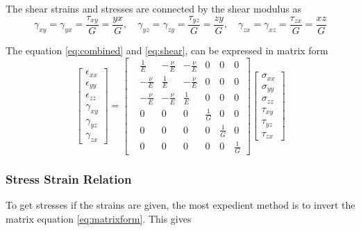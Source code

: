 The shear strains and stresses are connected by the shear modulus as
\begin{equation}
\gamma_{xy} = \gamma_{yx} = \frac{\tau_{xy}}{G} = \frac{yx}{G}, \quad 
\gamma_{yz} = \gamma_{zy} = \frac{\tau_{yz}}{G} = \frac{zy}{G}, \quad
\gamma_{zx} = \gamma_{xz} = \frac{\tau_{zx}}{G} = \frac{xz}{G}
\label{eq:shear}
\end{equation}

The equation \ref{eq:combined} and \ref{eq:shear}, can be expressed in matrix form
\begin{equation}
\begin{bmatrix}
\epsilon_{xx}\\ 
\epsilon_{yy}\\ 
\epsilon_{zz}\\ 
\gamma_{xy}\\ 
\gamma_{yz}\\
\gamma_{zx} 
\end{bmatrix}
=
\begin{bmatrix}
 &\frac{1}{E}  &-\frac{\nu}{E}  &-\frac{\nu}{E}  &0  &0  &0 \\ 
 &-\frac{\nu}{E}  &\frac{1}{E}  &-\frac{\nu}{E}  &0  &0 &0 \\ 
 &-\frac{\nu}{E}  &-\frac{\nu}{E}  &\frac{1}{E}  &0  &0 &0 \\ 
 &0  &0  &0  &\frac{1}{G}  &0 &0 \\
 &0  &0  &0  &0  &\frac{1}{G} &0 \\ 
 &0  &0  &0  &0  &0 &\frac{1}{G}
\end{bmatrix}
\begin{bmatrix}
\sigma_{xx}\\ 
\sigma_{yy}\\ 
\sigma_{zz}\\ 
\tau_{xy}\\ 
\tau_{yz}\\
\tau_{zx} 
\end{bmatrix}
\label{eq:matrixform}
\end{equation}


\subsubsection{Stress Strain Relation}
To get stresses if the strains are given, the most expedient method is to invert the matrix equation \ref{eq:matrixform}. This gives


